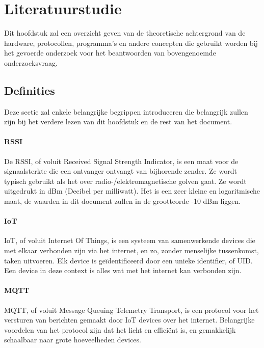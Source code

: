 
\chapter{Literatuurstudie}
\label{ch:literatuurstudie}

Dit hoofdstuk zal een overzicht geven van de theoretische achtergrond van de hardware, protocollen, programma's en andere concepten die gebruikt worden bij het gevoerde onderzoek voor het beantwoorden van bovengenoemde onderzoeksvraag.

\section{Definities}
\label{sec:lit-definities}
Deze sectie zal enkele belangrijke begrippen introduceren die belangrijk zullen zijn bij het verdere lezen van dit hoofdstuk en de rest van het document.

\subsubsection{RSSI}
De RSSI, of voluit Received Signal Strength Indicator, is een maat voor de signaalsterkte die een ontvanger ontvangt van bijhorende zender. Ze wordt typisch gebruikt als het over radio-/elektromagnetische golven gaat.\autocite{Admin2022} Ze wordt uitgedrukt in dBm (Decibel per milliwatt).\autocite{Tseard2016} Het is een zeer kleine en logaritmische maat, de waarden in dit document zullen in de grootteorde -10 dBm liggen.

\subsubsection{IoT}
IoT, of voluit Internet Of Things, is een systeem van samenwerkende devices die met elkaar verbonden zijn via het internet, en zo, zonder menselijke tussenkomst, taken uitvoeren. Elk device is geïdentificeerd door een unieke identifier, of UID. Een device in deze context is alles wat met het internet kan verbonden zijn.\autocite{Gillis2022}

\subsubsection{MQTT}
MQTT, of voluit Message Queuing Telemetry Transport, is een protocol voor het versturen van berichten gemaakt door IoT devices over het internet. Belangrijke voordelen van het protocol zijn dat het licht en efficiënt is, en gemakkelijk schaalbaar naar grote hoeveelheden devices.\autocite{MQTT2022}


